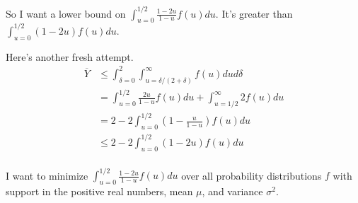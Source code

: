 \documentclass{article}
\newcommand \p[1] {\mathrm P \left(#1\right)}
\begin{document}
So I want a lower bound on $\int_{u=0}^{1/2} \frac{1-2u}{1-u} f(u) du$. It's greater than $\int_{u=0}^{1/2} (1-2u)f(u)du$.

Here's another fresh attempt.
\begin{align*}
\overline Y &\leq \int_{\delta=0}^2 \int_{u=\delta/(2+\delta)}^\infty f(u) du d\delta \\
&= \int_{u=0}^{1/2} \frac{2u}{1-u} f(u) du + \int_{u=1/2}^\infty 2f(u) du \\
&= 2 - 2\int_{u=0}^{1/2} \left(1-\frac{u}{1-u}\right)f(u)du \\
&\leq 2 - 2\int_{u=0}^{1/2} (1-2u)f(u)du \\
\end{align*}


I want to minimize $\int_{u=0}^{1/2} \frac{1-2u}{1-u} f(u) du$ over all probability distributions $f$ with support in the positive real numbers, mean $\mu$, and variance $\sigma^2$.
\end{document}
